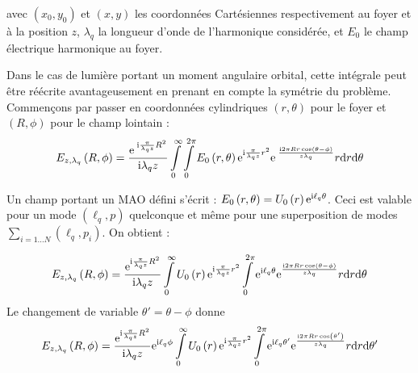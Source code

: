 avec $\left( {{x_0},{y_0}} \right)$ et $\left( {x,y} \right)$ les coordonnées Cartésiennes respectivement au foyer et à la position $z$, ${\lambda _q}$ la longueur d'onde de l'harmonique considérée, et ${E_0}$ le champ électrique harmonique au foyer.

Dans le cas de lumière portant un moment angulaire orbital, cette intégrale peut être réécrite avantageusement en prenant en compte la symétrie du problème. Commençons par passer en coordonnées cylindriques $\left( {r,\theta } \right)$ pour le foyer et $\left( {R,\phi } \right)$ pour le champ lointain :
\begin{equation*}
{E_{z,{\lambda _q}}}\left( {R,\phi } \right) = \frac{{{\mathrm{e}^{\;\mathrm{i}\frac{{\pi}}{{{\lambda _q}z}}{R^2}}}}}{{\mathrm{i}{\lambda _q}z}}\int \limits_0^\infty \int \limits_0^{2{\pi}} {E_0}\left( {r,\theta } \right){\mathrm{e}^{\mathrm{i}\frac{{\pi}}{{{\lambda _q}z}}{r^2}}}{\mathrm{e}^{\;\frac{{ \mathrm{i} 2{\pi}Rr\cos \left( {\theta  - \phi } \right)}}{{z{\lambda _q}}}}}r{\mathrm{d}}r{\mathrm{d}}\theta 
\end{equation*}

Un champ portant un MAO défini s'écrit : ${E_0}\left( {r,\theta } \right) = {U_0}\left( r \right){\mathrm{e}^{\mathrm{i}{\ell _{q}}{\theta}}}$. Ceci est valable pour un mode $(\ell_q,p)$ quelconque et même pour une superposition de modes $\sum_{i=1\ldots N}(\ell_q,p_i)$. On obtient :

\begin{equation*}
	{E_{z,{\lambda _q}}}\left( {R,\phi } \right) = \frac{{{\mathrm{e}^{\mathrm{i}\frac{{\pi}}{{{\lambda _q}z}}{R^2}}}}}{{\mathrm{i}{\lambda _q}z}}\int \limits_0^\infty  {U_0}\left( r \right){\mathrm{e}^{\mathrm{i}\frac{{\pi }}{{{\lambda _q}z}}{r^2}}}
	\int \limits_0^{2{\pi }} {\mathrm{e}^{\mathrm{i}{\ell _{q}{\theta }}}{\mathrm{e}^{\frac{{ \mathrm{i} 2{\pi }Rr\cos \left( {\theta  - \phi } \right)}}{{z{\lambda _q}}}}}r{\mathrm{d}}r{\mathrm{d}}\theta}
\end{equation*}
Le changement de variable $\theta'=\theta-\phi$ donne
\begin{equation*}
	{E_{z,{\lambda _q}}}\left( {R,\phi } \right) = \frac{{{\mathrm{e}^{\mathrm{i}\frac{{\pi}}{{{\lambda _q}z}}{R^2}}}}}{{\mathrm{i}{\lambda _q}z}}
	\mathrm{e}^{\mathrm{i}{\ell _{q}{\phi}}}
	\int \limits_0^\infty  {U_0}\left( r \right){\mathrm{e}^{\mathrm{i}\frac{{\pi }}{{{\lambda _q}z}}{r^2}}}
	\int \limits_0^{2{\pi }} {\mathrm{e}^{\mathrm{i}{\ell _{q}{\theta' }}}{\mathrm{e}^{\frac{{ \mathrm{i} 2{\pi }Rr\cos \left( {\theta'} \right)}}{{z{\lambda _q}}}}}r{\mathrm{d}}r{\mathrm{d}}\theta'}
\end{equation*}

